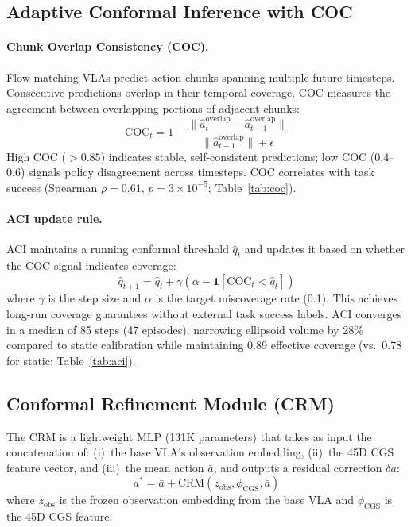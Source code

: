 \documentclass[letterpaper]{article}
\begin{document}
\subsection{Adaptive Conformal Inference with COC}
\label{sec:aci}

\paragraph{Chunk Overlap Consistency (COC).}
Flow-matching VLAs predict action chunks spanning multiple future timesteps.
Consecutive predictions overlap in their temporal coverage.
COC measures the agreement between overlapping portions of adjacent chunks:
\begin{equation}
\text{COC}_t = 1 - \frac{\|\hat{a}_{t}^{\text{overlap}} - \hat{a}_{t-1}^{\text{overlap}}\|}{\|\hat{a}_{t-1}^{\text{overlap}}\| + \epsilon}
\end{equation}
High COC ($>0.85$) indicates stable, self-consistent predictions; low COC ($0.4$--$0.6$) signals policy disagreement across timesteps.
COC correlates with task success (Spearman $\rho{=}0.61$, $p{=}3{\times}10^{-5}$; Table~\ref{tab:coc}).

\paragraph{ACI update rule.}
ACI maintains a running conformal threshold $\hat{q}_t$ and updates it based on whether the COC signal indicates coverage:
\begin{equation}
\hat{q}_{t+1} = \hat{q}_t + \gamma(\alpha - \mathbf{1}[\text{COC}_t < \hat{q}_t])
\end{equation}
where $\gamma$ is the step size and $\alpha$ is the target miscoverage rate (0.1).
This achieves long-run coverage guarantees without external task success labels.
ACI converges in a median of 85 steps (47 episodes), narrowing ellipsoid volume by 28\% compared to static calibration while maintaining 0.89 effective coverage (vs.\ 0.78 for static; Table~\ref{tab:aci}).

\subsection{Conformal Refinement Module (CRM)}
\label{sec:crm}

The CRM is a lightweight MLP (131K parameters) that takes as input the concatenation of: (i)~the base VLA's observation embedding, (ii)~the 45D CGS feature vector, and (iii)~the mean action $\bar{a}$, and outputs a residual correction $\delta a$:
\begin{equation}
a^* = \bar{a} + \text{CRM}(z_{\text{obs}}, \phi_{\text{CGS}}, \bar{a})
\end{equation}
where $z_{\text{obs}}$ is the frozen observation embedding from the base VLA and $\phi_{\text{CGS}}$ is the 45D CGS feature.
\end{document}
